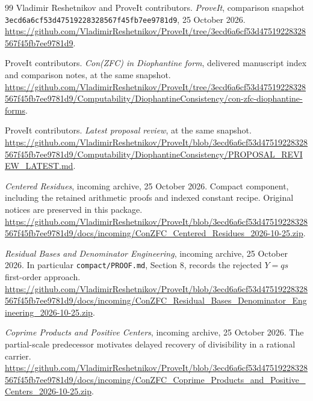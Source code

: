 \documentclass[11pt,letterpaper]{article}
\theoremstyle{definition}
\theoremstyle{remark}
\begin{document}
\begingroup
\small
\setlength{\abovedisplayskip}{5pt}
\setlength{\belowdisplayskip}{5pt}
\setlength{\jot}{2pt}

\endgroup

\clearpage
\begingroup
\setlength{\LTpre}{4pt}
\setlength{\LTpost}{6pt}

\endgroup

\clearpage
\begin{thebibliography}{99}
Vladimir Reshetnikov and ProveIt contributors.
\emph{ProveIt}, comparison snapshot
\texttt{3ecd6a6cf53d47519228328567f45fb7ee9781d9}, 25 October 2026.
\url{https://github.com/VladimirReshetnikov/ProveIt/tree/3ecd6a6cf53d47519228328567f45fb7ee9781d9}.

ProveIt contributors. \emph{Con(ZFC) in Diophantine form}, delivered
manuscript index and comparison notes, at the same snapshot.
\url{https://github.com/VladimirReshetnikov/ProveIt/tree/3ecd6a6cf53d47519228328567f45fb7ee9781d9/Computability/DiophantineConsistency/con-zfc-diophantine-forms}.

ProveIt contributors. \emph{Latest proposal review}, at the same snapshot.
\url{https://github.com/VladimirReshetnikov/ProveIt/blob/3ecd6a6cf53d47519228328567f45fb7ee9781d9/Computability/DiophantineConsistency/PROPOSAL_REVIEW_LATEST.md}.

\emph{Centered Residues}, incoming archive, 25 October 2026.
Compact component, including the retained arithmetic proofs and indexed
constant recipe.  Original notices are preserved in this package.
\url{https://github.com/VladimirReshetnikov/ProveIt/blob/3ecd6a6cf53d47519228328567f45fb7ee9781d9/docs/incoming/ConZFC_Centered_Residues_2026-10-25.zip}.

\emph{Residual Bases and Denominator Engineering}, incoming archive,
25 October 2026.  In particular \texttt{compact/PROOF.md}, Section 8,
records the rejected $Y=qs$ first-order approach.
\url{https://github.com/VladimirReshetnikov/ProveIt/blob/3ecd6a6cf53d47519228328567f45fb7ee9781d9/docs/incoming/ConZFC_Residual_Bases_Denominator_Engineering_2026-10-25.zip}.

\emph{Coprime Products and Positive Centers}, incoming archive,
25 October 2026.  The partial-scale predecessor motivates delayed recovery
of divisibility in a rational carrier.
\url{https://github.com/VladimirReshetnikov/ProveIt/blob/3ecd6a6cf53d47519228328567f45fb7ee9781d9/docs/incoming/ConZFC_Coprime_Products_and_Positive_Centers_2026-10-25.zip}.


\end{thebibliography}
\end{document}
